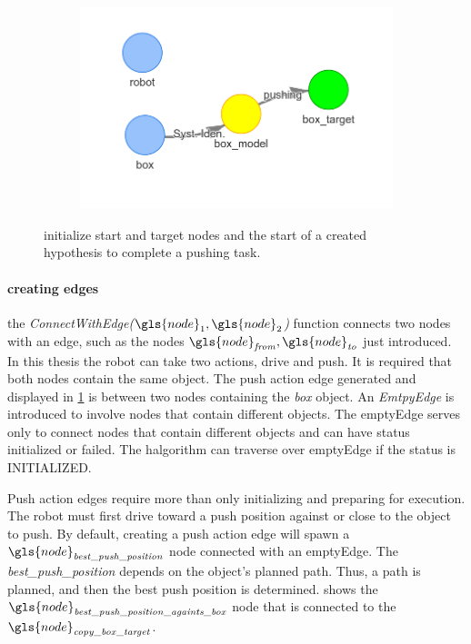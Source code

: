 \begin{figure}[h]
\begin{subfigure}{.3\textwidth}
    \caption{}\label{subfig:robot_push_2}
    \end{subfigure}
    \begin{subfigure}{.3\textwidth}
    \includegraphics[width=1.1\textwidth]{figures/proposed_method/connecting_nodes/robot_push/robot_push_2}
    \caption{}\label{subfig:robot_push_3}
    \end{subfigure}
    \caption{initialize start and target nodes and the start of a created hypothesis to complete a pushing task.}%
    \label{fig:robot_push_1}
\end{figure}

\paragraph{creating edges}
the \textit{ConnectWithEdge($\gls{node}_1, \gls{node}_2$)} function connects two nodes with an edge, such as the nodes $\gls{node}_\mathit{from}, \gls{node}_\mathit{to}$ just introduced. In this thesis the robot can take two actions, drive and push. It is required that both nodes contain the same object. The push action edge generated and displayed in \cref{subfig:robot_push_2} is between two nodes containing the \textit{box} object. An \textit{EmtpyEdge} is introduced to involve nodes that contain different objects. The emptyEdge serves only to connect nodes that contain different objects and can have status initialized or failed. The \ac{halgorithm} can traverse over emptyEdge if the status is INITIALIZED.\bs


Push action edges require more than only initializing and preparing for execution. The robot must first drive toward a push position against or close to the object to push. By default, creating a push action edge will spawn a $\gls{node}_\mathit{best\_push\_position}$ node connected with an emptyEdge. The \textit{best\_push\_position} depends on the object's planned path. Thus, a path is planned, and then the best push position is determined.  shows the $\gls{node}_\mathit{best\_push\_position\_againts\_box}$ node that is connected to the $\gls{node}_\mathit{copy\_box\_target}$. 


